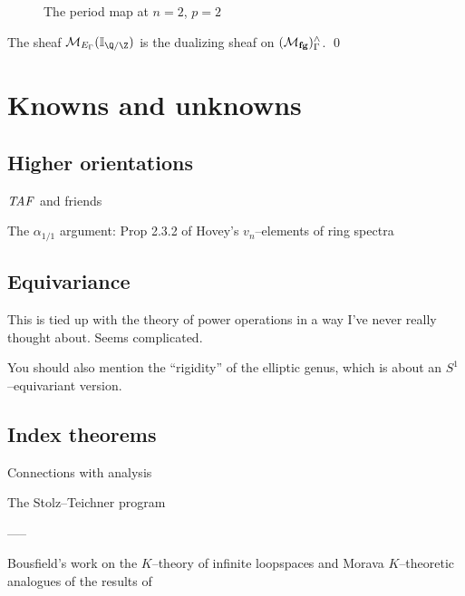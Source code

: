 \begin{figure}
\caption{The period map at $n = 2$, $p = 2$}
\end{figure}

\begin{theorem}
The sheaf $\context{E_\Gamma}(\mathbb I_{\Q/\Z})$ is the dualizing sheaf on $(\mathcal{M}_{\mathbf{fg}})^\wedge_\Gamma$. \qed
\end{theorem}





\section{Knowns and unknowns}



\subsection*{Higher orientations}

$\mathit{TAF}$ and friends\label{TAFDiscussion}

The $\alpha_{1/1}$ argument: Prop 2.3.2 of Hovey's $v_n$--elements of ring spectra


\subsection*{Equivariance}

This is tied up with the theory of power operations in a way I've never really thought about.  Seems complicated.

You should also mention the ``rigidity'' of the elliptic genus, which is about an $S^1$--equivariant version.

\subsection*{Index theorems}

Connections with analysis

The Stolz--Teichner program








-----

Bousfield's work on the $K$--theory of infinite loopspaces \cite{BousfieldLambdaRings} and Morava $K$--theoretic analogues of the results of 

